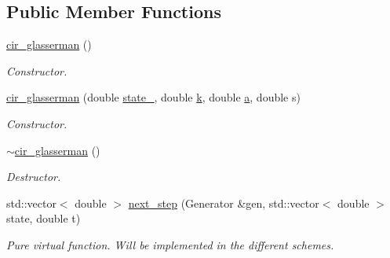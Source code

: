 \subsection*{Public Member Functions}
\begin{DoxyCompactItemize}
\item 
\mbox{\label{classcir__glasserman_a992c04280cd4f2bca585df0e940cd928}} 
\mbox{\hyperlink{classcir__glasserman_a992c04280cd4f2bca585df0e940cd928}{cir\+\_\+glasserman}} ()
\begin{DoxyCompactList}\small\item\em Constructor. \end{DoxyCompactList}\item 
\mbox{\label{classcir__glasserman_aa17f7ef0554ccd8a8e96779e9c8c501d}} 
\mbox{\hyperlink{classcir__glasserman_aa17f7ef0554ccd8a8e96779e9c8c501d}{cir\+\_\+glasserman}} (double \mbox{\hyperlink{classprocess_ab4d01c8ea2e9c8285134786d32ae42aa}{state\+\_}}, double \mbox{\hyperlink{classcir_aa5b05ff03ee8bb587ea94426a9ce704b}{k}}, double \mbox{\hyperlink{classcir_a358578305ea60d31c00546233304651c}{a}}, double s)
\begin{DoxyCompactList}\small\item\em Constructor. \end{DoxyCompactList}\item 
\mbox{\label{classcir__glasserman_a75da65ee14fd95b6352e76a432144122}} 
\mbox{\hyperlink{classcir__glasserman_a75da65ee14fd95b6352e76a432144122}{$\sim$cir\+\_\+glasserman}} ()
\begin{DoxyCompactList}\small\item\em Destructor. \end{DoxyCompactList}\item 
\mbox{\label{classcir__glasserman_aa3a48d9de6edccd4bfb8a52a5e5ad3df}} 
std\+::vector$<$ double $>$ \mbox{\hyperlink{classcir__glasserman_aa3a48d9de6edccd4bfb8a52a5e5ad3df}{next\+\_\+step}} (Generator \&gen, std\+::vector$<$ double $>$ state, double t)
\begin{DoxyCompactList}\small\item\em Pure virtual function. Will be implemented in the different schemes. \end{DoxyCompactList}\end{DoxyCompactItemize}
